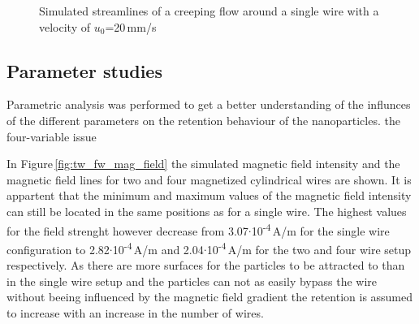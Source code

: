   \begin{figure}[H]
\centering

\caption[Simulated Stokes flow around cylinder]{Simulated streamlines of a creeping flow around a single wire with a velocity of $u_{0}$=20\,mm/s 
\label{fig:creep_flow_sw}
}
\end{figure}

\subsection{Parameter studies}
\label{subsec:Param_res}

Parametric analysis was performed to get a better understanding of the influnces of the different parameters on the retention behaviour of the nanoparticles.  the four-variable issue

In Figure\,\ref{fig:tw_fw_mag_field} the simulated magnetic field intensity and the magnetic field lines for two and four magnetized cylindrical wires are shown. It is appartent that the minimum and maximum values of the magnetic field intensity can still be located in the same positions as for a single wire. The highest values for the field strenght however decrease from 3.07$\cdotp$10\textsuperscript{-4}\,A/m for the single wire configuration to 2.82$\cdotp$10\textsuperscript{-4}\,A/m and 2.04$\cdotp$10\textsuperscript{-4}\,A/m for the two and four wire setup respectively. As there are more surfaces for the particles to be attracted to than in the single wire setup and the particles can not as easily bypass the wire without beeing influenced by the magnetic field gradient the retention is assumed to increase with an increase in the number of wires.  

